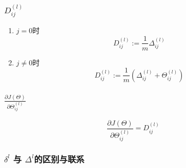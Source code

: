 \subsubsection{$D_{ij}^{(l)}$}
\begin{enumerate}
	\item $j=0$时
	\begin{equation}
		D_{ij}^{(l)} := \frac{1}{m}\Delta_{ij}^{(l)}
	\end{equation}
	\item $j \neq 0$时
		\begin{equation}
		D_{ij}^{(l)} := \frac{1}{m}(\Delta_{ij}^{(l)} + \Theta_{ij}^{(l)})
	\end{equation}
\end{enumerate}

\subsubsection{$\frac{\partial{J(\Theta)}}{\partial{\Theta_{ij}^{(l)}}}$}
\begin{equation}
	\frac{\partial{J(\Theta)}}{\partial{\Theta_{ij}^{(l)}}} = D_{ij}^{(l)}
\end{equation}

\subsubsection{$\delta^{l}$ 与 $\Delta^{l}$的区别与联系}













